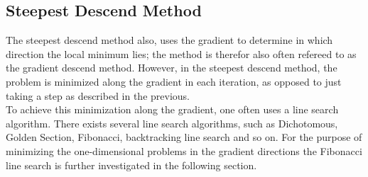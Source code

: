 \subsection{Steepest Descend Method}
The steepest descend method also, uses the gradient to determine in which direction the local minimum lies; the method is therefor also often refereed to as the gradient descend method. However, in the steepest descend method, the problem is minimized along the gradient in each iteration, as opposed to just taking a step as described in the previous.\\
To achieve this minimization along the gradient, one often uses a line search algorithm. There exists several line search algorithms, such as Dichotomous, Golden Section, Fibonacci, backtracking line search and so on. For the purpose of minimizing the one-dimensional problems in the gradient directions the Fibonacci line search is further investigated in the following section.